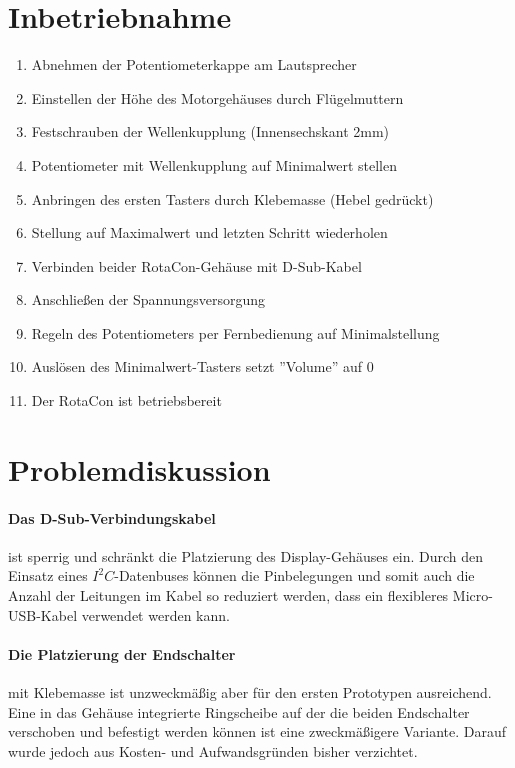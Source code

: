 \documentclass[11pt, titlepage]{report}
\begin{document}
		\section{Inbetriebnahme}
			\label{sec:HowTo}
			\begin{enumerate}
				\item Abnehmen der Potentiometerkappe am Lautsprecher
				\item Einstellen der Höhe des Motorgehäuses durch Flügelmuttern
				\item Festschrauben der Wellenkupplung (Innensechskant 2mm)
				\item Potentiometer mit Wellenkupplung auf Minimalwert stellen
				\item Anbringen des ersten Tasters durch Klebemasse (Hebel gedrückt)
				\item Stellung auf Maximalwert und letzten Schritt wiederholen
				\item Verbinden beider RotaCon-Gehäuse mit D-Sub-Kabel
				\item Anschließen der Spannungsversorgung
				\item Regeln des Potentiometers per Fernbedienung auf Minimalstellung
				\item Auslösen des Minimalwert-Tasters setzt ''Volume'' auf 0
				\item Der RotaCon ist betriebsbereit
			\end{enumerate}
		\newpage
		\section{Problemdiskussion}
		\label{sec:Probleme}
			\paragraph{Das D-Sub-Verbindungskabel}
			ist sperrig und schränkt die Platzierung des Display-Gehäuses ein. Durch den Einsatz eines $I^{2}C$-Datenbuses können die Pinbelegungen und somit auch die Anzahl der Leitungen im Kabel so reduziert werden, dass ein flexibleres Micro-USB-Kabel verwendet werden kann.
			
			\paragraph{Die Platzierung der Endschalter}
			mit Klebemasse ist unzweckmäßig aber für den ersten Prototypen ausreichend. Eine in das Gehäuse integrierte Ringscheibe auf der die beiden Endschalter verschoben und befestigt werden können ist eine zweckmäßigere Variante. Darauf wurde jedoch aus Kosten- und Aufwandsgründen bisher verzichtet.
			
\end{document}
